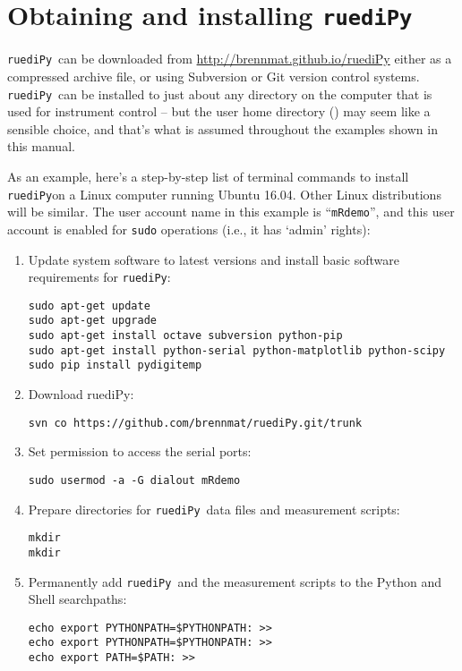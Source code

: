 \documentclass[12pt]{article}   	%
\newcommand{\ruediPy}{\texttt{ruediPy}}
\begin{document}
\section{Obtaining and installing \ruediPy}
\ruediPy\ can be downloaded from \url{http://brennmat.github.io/ruediPy} either as a compressed archive file, or using Subversion or Git version control systems. \ruediPy\ can be installed to just about any directory on the computer that is used for instrument control -- but the user home directory  () may seem like a sensible choice, and that's what is assumed throughout the examples shown in this manual.

As an example, here's a step-by-step list of terminal commands to install \ruediPy  on a Linux computer running Ubuntu 16.04. Other Linux distributions will be similar. The user account name in this example is ``\texttt{mRdemo}'', and this user account is enabled for \texttt{sudo} operations (i.e., it has `admin' rights):
\begin{enumerate}

\item Update system software to latest versions and install basic software requirements for \ruediPy:\par
\texttt{sudo apt-get update}\\
\texttt{sudo apt-get upgrade}\\
\texttt{sudo apt-get install octave subversion python-pip}\\
\texttt{sudo apt-get install python-serial python-matplotlib python-scipy}\\
\texttt{sudo pip install pydigitemp}\\

\item Download ruediPy:\par
\texttt{svn co https://github.com/brennmat/ruediPy.git/trunk }


\item Set permission to access the serial ports:\par
\texttt{sudo usermod -a -G dialout mRdemo}

\item Prepare directories for \ruediPy\ data files and measurement scripts:\par
\texttt{mkdir }\\
\texttt{mkdir }

\item Permanently add \ruediPy\ and the measurement scripts to the Python and Shell searchpaths:\par
\texttt{echo export PYTHONPATH=\textsc{}\$PYTHONPATH\textsc{}: >> }\\
\texttt{echo export PYTHONPATH=\textsc{}\$PYTHONPATH\textsc{}: >> }\\
\texttt{echo export PATH=\textsc{}\$PATH\textsc{}: >> }

\end{enumerate}
\end{document}
